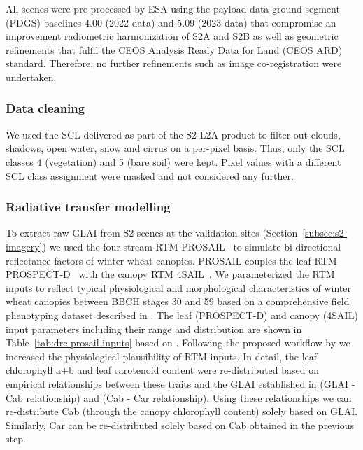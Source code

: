 All scenes were pre-processed by ESA using the payload data ground segment (PDGS) baselines 4.00 (2022 data) and 5.09 (2023 data) that compromise an improvement radiometric harmonization of S2A and S2B as well as geometric refinements that fulfil the CEOS Analysis Ready Data for Land (CEOS ARD) standard. Therefore, no further refinements such as image co-registration were undertaken.

\subsubsection{Data cleaning}
We used the \gls{SCL} delivered as part of the \gls{S2} L2A product to filter out clouds, shadows, open water, snow and cirrus on a per-pixel basis. Thus, only the SCL classes 4 (vegetation) and 5 (bare soil) were kept. Pixel values with a different \gls{SCL} class assignment were masked and not considered any further.

\subsubsection{Radiative transfer modelling}
To extract raw \gls{GLAI} from \gls{S2} scenes at the validation sites (Section~\ref{subsec:s2-imagery}) we used the four-stream \gls{RTM} PROSAIL~\citep{jacquemoud_prospectsail_2009} to simulate bi-directional reflectance factors of winter wheat canopies. PROSAIL couples the leaf \gls{RTM} PROSPECT-D~\citep{feret_prospect-d_2017} with the canopy \gls{RTM} 4SAIL~\citep{verhoef_light_1984}. We parameterized the \gls{RTM} inputs to reflect typical physiological and morphological characteristics of winter wheat canopies between \gls{BBCH} stages 30 and 59 based on a comprehensive field phenotyping dataset described in \cite{graf_insights_2023}. The leaf (PROSPECT-D) and canopy (4SAIL) input parameters including their range and distribution are shown in Table~\ref{tab:drc-prosail-inputs} based on \cite{graf_insights_2023}. Following the proposed workflow by \cite{graf_insights_2023} we increased the physiological plausibility of \gls{RTM} inputs. In detail, the leaf chlorophyll a+b and leaf carotenoid content were re-distributed based on empirical relationships between these traits and the \gls{GLAI} established in \cite{graf_insights_2023} (GLAI - Cab relationship) and \cite{wocher_rtm-based_2020} (Cab - Car relationship). Using these relationships we can re-distribute Cab (through the canopy chlorophyll content) solely based on \gls{GLAI}. Similarly, Car can be re-distributed solely based on Cab obtained in the previous step.

